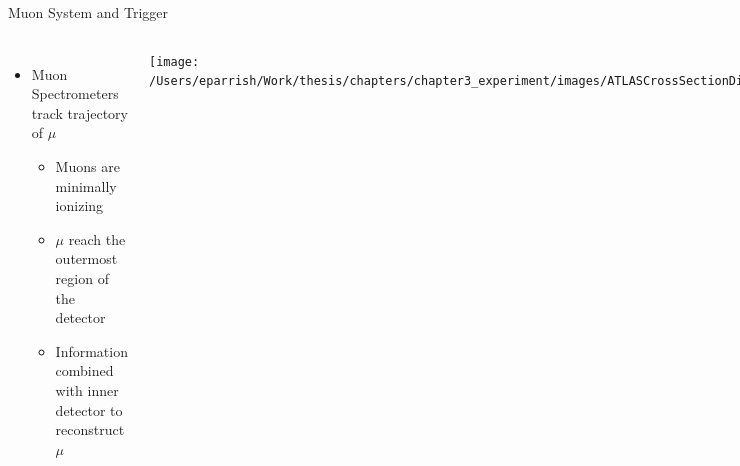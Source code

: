 \documentclass[aspectratio=169,xcolor=table]{beamer}
\begin{document}
    \begin{frame}[t]{Muon System and Trigger}
     \begin{columns}[t]
        \begin{itemize}
          \item Muon Spectrometers track trajectory of $\mu$
          \begin{itemize}
            \item Muons are minimally ionizing
            \item $\mu$ reach the outermost region of the detector
            \item Information combined with inner detector to reconstruct $\mu$
          \end{itemize}
        \end{itemize}

      \vspace{-.4cm}
      \begin{columns}
        \centering
        \texttt{[image: /Users/eparrish/Work/thesis/chapters/chapter3\_experiment/images/ATLASCrossSectionDiagram.png]}
        \centering
        \begin{figure}
          \texttt{[image: /Users/eparrish/Work/thesis/chapters/chapter3\_experiment/images/ATLAS\_Muon\_System\_Run2.png]}
          \caption{\tiny \cite{atlas-schematics}}
        \end{figure}
      \end{columns}

      \centering
      \begin{itemize}
        \item Trigger System
        \begin{itemize}
          \item Need to quickly sort through data and decide if a collision is interesting or not
          \item Mix of hardware and software
        \end{itemize}
      \end{itemize}
        \begin{figure}
          \centering
          \texttt{[image: /Users/eparrish/Work/thesis/chapters/chapter3\_experiment/images/tdaq-run2-schematic2017.png]}
          \caption{\tiny \cite{TDAQ_Diagram}}
        \end{figure}

      \end{columns}
    \end{frame}
\end{document}
